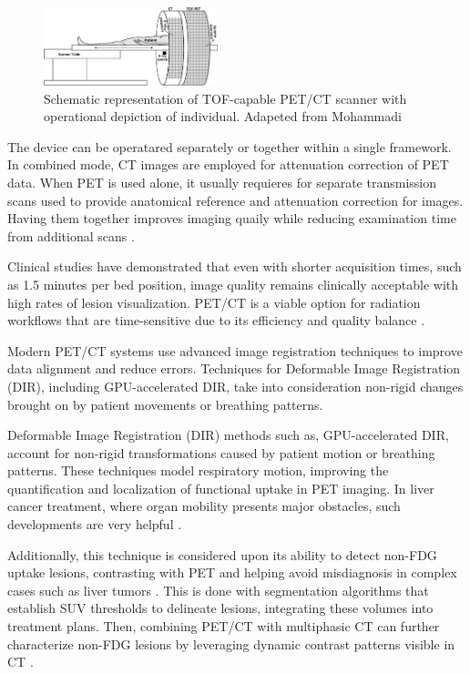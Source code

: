 \documentclass[11pt]{article} %
\begin{document}
\begin{multicols}{2}
\begin{figure}[H]
	\centering
	\includegraphics[width=0.45\textwidth]{assets/PETCTtable.jpg} 
	\caption{Schematic representation of TOF-capable PET/CT scanner with operational depiction of individual. Adapeted from Mohammadi \cite{figPETCT}}
	\label{fig:PETCTtable} 
\end{figure}

The device can be operatared separately or together within a single framework. In combined mode, CT images are employed for attenuation correction of PET data. When PET is used alone, it usually requieres for separate transmission scans used to provide anatomical reference and attenuation correction for images. Having them together improves imaging quaily while reducing examination time from additional scans \cite{townsend2004, zaidi2005}.

Clinical studies have demonstrated that even with shorter acquisition times, such as 1.5 minutes per bed position, image quality remains clinically acceptable with high rates of lesion visualization. PET/CT is a viable option for radiation workflows that are time-sensitive due to its efficiency and quality balance \cite{hasegawa2012}.


Modern PET/CT systems use advanced image registration techniques to improve data alignment and reduce errors.
Techniques for Deformable Image Registration (DIR), including GPU-accelerated DIR, take into consideration non-rigid changes brought on by patient movements or breathing patterns. 

Deformable Image Registration (DIR) methods such as, GPU-accelerated DIR, account for non-rigid transformations caused by patient motion or breathing patterns. These techniques model respiratory motion, improving the quantification and localization of functional uptake in PET imaging. In liver cancer treatment, where organ mobility presents major obstacles, such developments are very helpful \cite{shi2023}.
 
Additionally, this technique is considered upon its ability to detect non-FDG uptake lesions, contrasting with PET and helping avoid misdiagnosis in complex cases such as liver tumors \cite{yan2024, decazes2021}. This is done with segmentation algorithms that establish SUV thresholds to delineate lesions, integrating these volumes into treatment plans. Then, combining PET/CT with multiphasic CT can further characterize non-FDG lesions by leveraging dynamic contrast patterns visible in CT \cite{TG174}.


\end{multicols}
\end{document}
